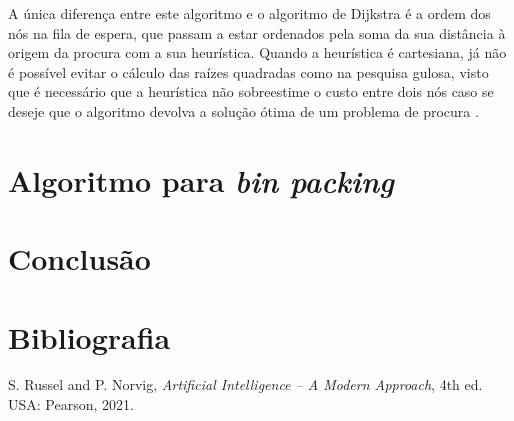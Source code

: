 \documentclass[12pt, a4paper]{article}
\begin{document}
A única diferença entre este algoritmo e o algoritmo de Dijkstra é a ordem dos nós na fila de
espera, que passam a estar ordenados pela soma da sua distância à origem da procura com a sua
heurística. Quando a heurística é cartesiana, já não é possível evitar o cálculo das raízes
quadradas como na pesquisa gulosa, visto que é necessário que a heurística não sobreestime o custo
entre dois nós caso se deseje que o algoritmo devolva a solução ótima de um problema de procura
\cite{aima}.

\section{Algoritmo para \emph{bin packing}}

\section{Conclusão}

\section{Bibliografia}
\def\refname{}
\vspace{-1.5cm}
\begin{thebibliography}{9}
     S. Russel and P. Norvig, \emph{Artificial Intelligence -- A Modern Approach},
        4th ed. USA: Pearson, 2021.
\end{thebibliography}
\end{document}
